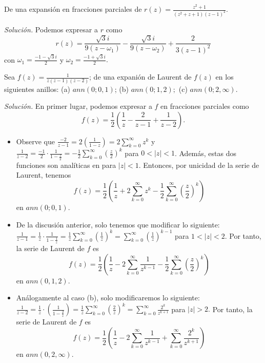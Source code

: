 \documentclass[12pt]{article}
\newenvironment{problem}[2][Problema]{\begin{trivlist}
\item[\hskip \labelsep {\bfseries #1}\hskip \labelsep {\bfseries #2.}]}{\end{trivlist}}
\begin{document}
\begin{problem}{2 pp. 110} De una expansión en fracciones parciales de $r(z) = \frac{z^2 + 1}{(z^2 + z + 1)(z-1)^2}.$
\end{problem}
\textit{Solución.}
Podemos expresar a $r$ como 
$$ 
r(z) = \frac{\sqrt{3} i }{ 9 (z - \omega_1)} - \frac{\sqrt{3} i}{9(z - \omega_2)} + \frac{2}{3(z-1)^2} 
$$
con $\omega_1 = \frac{-1 - \sqrt{3} i}{2}$ y $\omega_2 = \frac{-1 + \sqrt{3}i }{2}.$

\begin{problem}{4 pp. 110}
Sea $f(z) = \frac{1}{z (z-1)(z-2)}$; de una expanión de Laurent de $f(z)$ en los siguientes anillos: (a) $ann(0; 0, 1)$; (b) $ann(0; 1, 2);$ (c) $ann(0; 2, \infty)$.

\end{problem}

\textit{Solución.} En primer lugar, podemos expresar a $f$ en fracciones parciales como 
$$
f(z) = \frac{1}{2} \left( \frac{1}{z} - \frac{2}{z-1} + \frac{1}{z-2} \right).
$$
\begin{itemize}
    \item[(a)] Observe que $\frac{-2}{z-1} = 2 \left( \frac{1}{1-z} \right) = 2 \sum_{k=0}^\infty z^k$ y $\frac{1}{z-2} = \frac{-1}{2} \cdot \frac{1}{1 - \frac{z}{2}} = - \frac{1}{2} \sum_{k=0}^\infty \left( \frac{z}{2} \right)^k$ para $0 < \lvert z \rvert < 1$. Además, estas dos funciones son analíticas en para $\lvert z \rvert < 1$. Entonces, por unicidad de la serie de Laurent, tenemos
    $$
    f(z) =  \frac{1}{2} \left( \frac{1}{z} + 2 \sum_{k=0}^\infty z^k
    - \frac{1}{2} \sum_{k=0}^\infty \left( \frac{z}{2} \right)^k \right)
    $$
    en $ann(0; 0, 1).$
    
    \item[(b)] De la discusión anterior, solo tenemos que modificar lo siguiente: $\frac{1}{z-1} = \frac{1}{z} \cdot \frac{1}{1- \frac{1}{z}} = \frac{1}{z} \sum_{k=0}^\infty \left(\frac{1}{z}\right)^k= \sum_{k=0}^\infty \left(\frac{1}{z}\right)^{k-1}$ para $1 < \lvert z \rvert < 2$. Por tanto, la serie de Laurent de $f$ es
    $$
    f(z) =  \frac{1}{2} \left( \frac{1}{z} - 2 \sum_{k=0}^\infty  \frac{1}{z^{k-1}}  - \frac{1}{2} \sum_{k=0}^\infty \left( \frac{z}{2} \right)^k \right)
    $$
    en $ann(0, 1, 2)$.
    
    \item[(c)] Análogamente al caso (b), solo modificaremos lo siguiente: $\frac{1}{z-2} = \frac{1}{z} \cdot \left( \frac{1}{1 - \frac{2}{z}} \right) = \frac{1}{z} \sum_{k=0}^\infty \left( \frac{2}{z} \right)^k = \sum_{k=0}^\infty \frac{2^k}{z^{k+1}}$ para $\lvert z \rvert > 2.$ Por tanto, la serie de Laurent de $f$ es
    $$
    f(z) = \frac{1}{2} \left( \frac{1}{z} -
    2 \sum_{k=0}^\infty  \frac{1}{z^{k-1}} + \sum_{k=0}^\infty \frac{2^k}{z^{k+1}}
    \right)
    $$
    en $ann(0, 2, \infty).$
\end{itemize}
\end{document}
